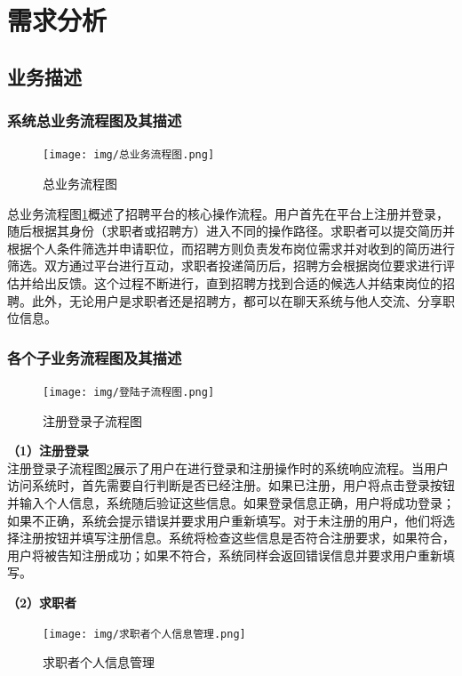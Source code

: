 \documentclass[UTF8,a4paper,10pt]{ctexart}
\begin{document}
\section{需求分析}

\subsection{业务描述}

\subsubsection{系统总业务流程图及其描述}

\begin{figure}[H]
    \centering
    \texttt{[image: img/总业务流程图.png]}
    \caption{总业务流程图}
    \label{fig:总业务流程图}
\end{figure}

总业务流程图\ref{fig:总业务流程图}概述了招聘平台的核心操作流程。用户首先在平台上注册并登录，随后根据其身份（求职者或招聘方）进入不同的操作路径。求职者可以提交简历并根据个人条件筛选并申请职位，而招聘方则负责发布岗位需求并对收到的简历进行筛选。双方通过平台进行互动，求职者投递简历后，招聘方会根据岗位要求进行评估并给出反馈。这个过程不断进行，直到招聘方找到合适的候选人并结束岗位的招聘。此外，无论用户是求职者还是招聘方，都可以在聊天系统与他人交流、分享职位信息。

\subsubsection{各个子业务流程图及其描述}

\begin{figure}[H]
    \centering
    \texttt{[image: img/登陆子流程图.png]}
    \caption{注册登录子流程图}
    \label{fig:注册登录子流程图}
\end{figure}

\textbf{（1）注册登录} \\注册登录子流程图\ref{fig:注册登录子流程图}展示了用户在进行登录和注册操作时的系统响应流程。当用户访问系统时，首先需要自行判断是否已经注册。如果已注册，用户将点击登录按钮并输入个人信息，系统随后验证这些信息。如果登录信息正确，用户将成功登录；如果不正确，系统会提示错误并要求用户重新填写。对于未注册的用户，他们将选择注册按钮并填写注册信息。系统将检查这些信息是否符合注册要求，如果符合，用户将被告知注册成功；如果不符合，系统同样会返回错误信息并要求用户重新填写。

\textbf{（2）求职者} \\
\begin{figure}[H]
    \centering
    \texttt{[image: img/求职者个人信息管理.png]}
    \caption{求职者个人信息管理}
    \label{fig:求职者个人信息管理}
\end{figure}
\end{document}
